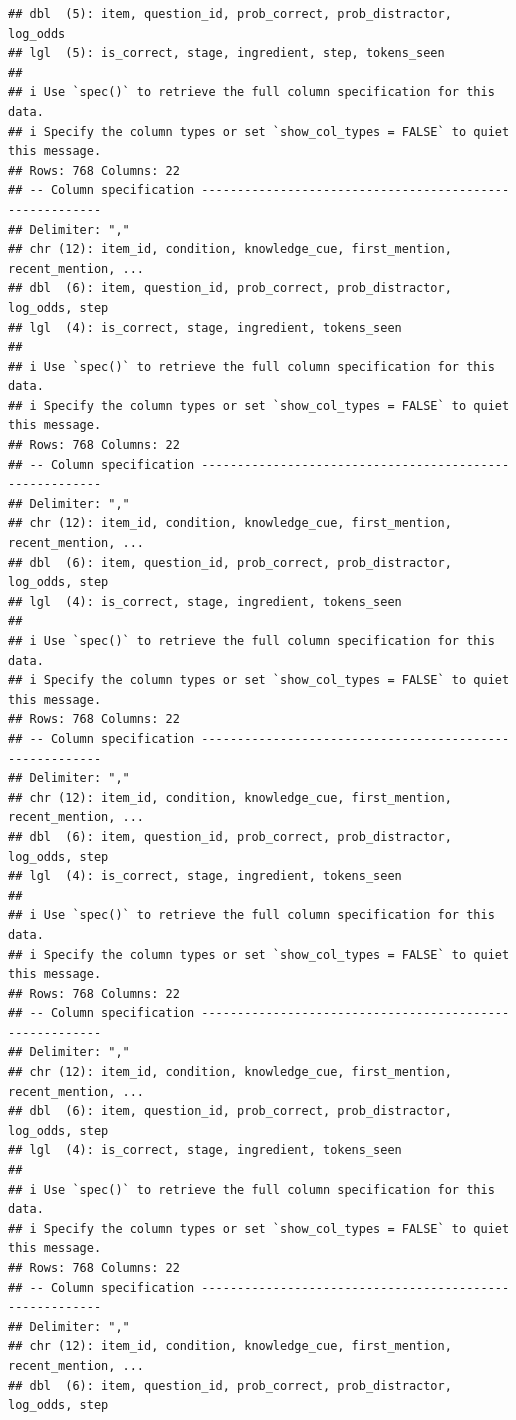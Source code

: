 \documentclass[
]{article}
\begin{document}
\begin{verbatim}
## dbl  (5): item, question_id, prob_correct, prob_distractor, log_odds
## lgl  (5): is_correct, stage, ingredient, step, tokens_seen
## 
## i Use `spec()` to retrieve the full column specification for this data.
## i Specify the column types or set `show_col_types = FALSE` to quiet this message.
## Rows: 768 Columns: 22
## -- Column specification --------------------------------------------------------
## Delimiter: ","
## chr (12): item_id, condition, knowledge_cue, first_mention, recent_mention, ...
## dbl  (6): item, question_id, prob_correct, prob_distractor, log_odds, step
## lgl  (4): is_correct, stage, ingredient, tokens_seen
## 
## i Use `spec()` to retrieve the full column specification for this data.
## i Specify the column types or set `show_col_types = FALSE` to quiet this message.
## Rows: 768 Columns: 22
## -- Column specification --------------------------------------------------------
## Delimiter: ","
## chr (12): item_id, condition, knowledge_cue, first_mention, recent_mention, ...
## dbl  (6): item, question_id, prob_correct, prob_distractor, log_odds, step
## lgl  (4): is_correct, stage, ingredient, tokens_seen
## 
## i Use `spec()` to retrieve the full column specification for this data.
## i Specify the column types or set `show_col_types = FALSE` to quiet this message.
## Rows: 768 Columns: 22
## -- Column specification --------------------------------------------------------
## Delimiter: ","
## chr (12): item_id, condition, knowledge_cue, first_mention, recent_mention, ...
## dbl  (6): item, question_id, prob_correct, prob_distractor, log_odds, step
## lgl  (4): is_correct, stage, ingredient, tokens_seen
## 
## i Use `spec()` to retrieve the full column specification for this data.
## i Specify the column types or set `show_col_types = FALSE` to quiet this message.
## Rows: 768 Columns: 22
## -- Column specification --------------------------------------------------------
## Delimiter: ","
## chr (12): item_id, condition, knowledge_cue, first_mention, recent_mention, ...
## dbl  (6): item, question_id, prob_correct, prob_distractor, log_odds, step
## lgl  (4): is_correct, stage, ingredient, tokens_seen
## 
## i Use `spec()` to retrieve the full column specification for this data.
## i Specify the column types or set `show_col_types = FALSE` to quiet this message.
## Rows: 768 Columns: 22
## -- Column specification --------------------------------------------------------
## Delimiter: ","
## chr (12): item_id, condition, knowledge_cue, first_mention, recent_mention, ...
## dbl  (6): item, question_id, prob_correct, prob_distractor, log_odds, step

\end{verbatim}
\end{document}
